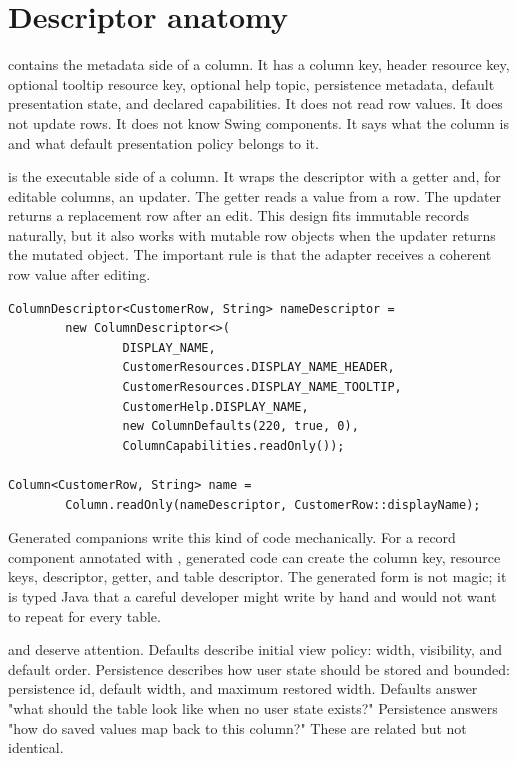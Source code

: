 \section{Descriptor anatomy}

 contains the metadata side of a column. It has a
column key, header resource key, optional tooltip resource key, optional help
topic, persistence metadata, default presentation state, and declared
capabilities. It does not read row values. It does not update rows. It does
not know Swing components. It says what the column is and what default
presentation policy belongs to it.

 is the executable side of a column. It wraps the descriptor
with a getter and, for editable columns, an updater. The getter reads a value
from a row. The updater returns a replacement row after an edit. This design
fits immutable records naturally, but it also works with mutable row objects
when the updater returns the mutated object. The important rule is that the
adapter receives a coherent row value after editing.

\begin{lstlisting}[caption={A handwritten descriptor-backed column.}]
ColumnDescriptor<CustomerRow, String> nameDescriptor =
        new ColumnDescriptor<>(
                DISPLAY_NAME,
                CustomerResources.DISPLAY_NAME_HEADER,
                CustomerResources.DISPLAY_NAME_TOOLTIP,
                CustomerHelp.DISPLAY_NAME,
                new ColumnDefaults(220, true, 0),
                ColumnCapabilities.readOnly());

Column<CustomerRow, String> name =
        Column.readOnly(nameDescriptor, CustomerRow::displayName);
\end{lstlisting}

Generated  companions write this kind of code mechanically.
For a record component annotated with , generated code can create
the column key, resource keys, descriptor, getter, and table descriptor. The
generated form is not magic; it is typed Java that a careful developer might
write by hand and would not want to repeat for every table.

 and  deserve attention. Defaults
describe initial view policy: width, visibility, and default order. Persistence
describes how user state should be stored and bounded: persistence id, default
width, and maximum restored width. Defaults answer "what should the table look
like when no user state exists?" Persistence answers "how do saved values map
back to this column?" These are related but not identical.

